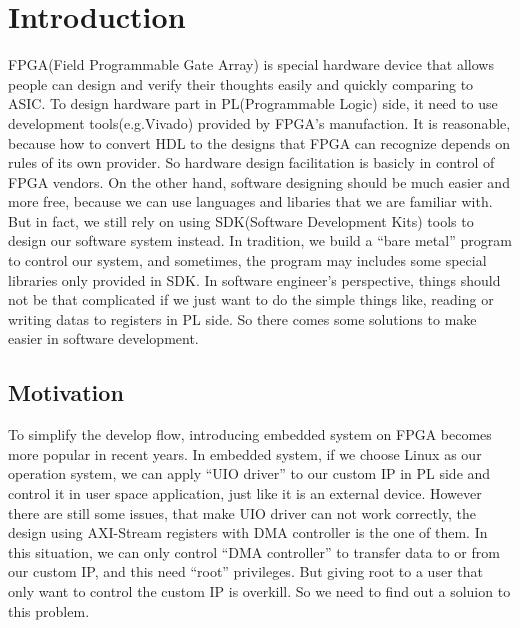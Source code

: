 \chapter{Introduction}
\label{cha:introduction}
FPGA(Field Programmable Gate Array) is special hardware device that allows people can design and verify their thoughts easily and quickly comparing to ASIC. To design hardware part in PL(Programmable Logic) side, it need to use development tools(e.g.Vivado) provided by FPGA's manufaction. It is reasonable, because how to convert HDL to the designs that FPGA can recognize depends on rules of its own provider. So hardware design facilitation is basicly in control of FPGA vendors. On the other hand, software designing should be much easier and more free, because we can use languages and libaries that we are familiar with. But in fact, we still rely on using SDK(Software Development Kits) tools to design our software system instead. In tradition, we build a ``bare metal'' program to control our system, and sometimes, the program may includes some special libraries only provided in SDK. In software engineer's perspective, things should not be that complicated if we just want to do the simple things like, reading or writing datas to registers in PL side. So there comes some solutions to make easier in software development.  


\section{Motivation}
\label{sec:Motivation}

 To simplify the develop flow, introducing embedded system on FPGA becomes more popular in recent years. In embedded system, if we choose Linux as our operation system, we can apply ``UIO driver'' to our custom IP in PL side and control it in user space application, just like it is an external device. However there are still some issues, that make UIO driver can not work correctly, the design using AXI-Stream registers with DMA controller is the one of them. In this situation, we can only control ``DMA controller'' to transfer data to or from our custom IP, and this need ``root'' privileges. But giving root to a user that only want to control the custom IP is overkill. So we need to find out a soluion to this problem. 

